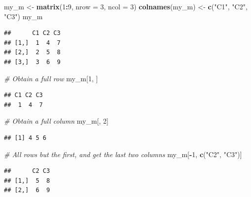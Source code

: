 \documentclass[
]{book}
\newenvironment{Shaded}{\begin{snugshade}}{\end{snugshade}}
\newcommand{\CommentTok}[1]{\textcolor[rgb]{0.56,0.35,0.01}{\textit{#1}}}
\newcommand{\DataTypeTok}[1]{\textcolor[rgb]{0.13,0.29,0.53}{#1}}
\newcommand{\DecValTok}[1]{\textcolor[rgb]{0.00,0.00,0.81}{#1}}
\newcommand{\KeywordTok}[1]{\textcolor[rgb]{0.13,0.29,0.53}{\textbf{#1}}}
\newcommand{\NormalTok}[1]{#1}
\newcommand{\OperatorTok}[1]{\textcolor[rgb]{0.81,0.36,0.00}{\textbf{#1}}}
\newcommand{\StringTok}[1]{\textcolor[rgb]{0.31,0.60,0.02}{#1}}
\begin{document}
\begin{Shaded}
\begin{Highlighting}[]
\NormalTok{my_m <-}\StringTok{ }\KeywordTok{matrix}\NormalTok{(}\DecValTok{1}\OperatorTok{:}\DecValTok{9}\NormalTok{, }\DataTypeTok{nrow =} \DecValTok{3}\NormalTok{, }\DataTypeTok{ncol =} \DecValTok{3}\NormalTok{)}
\KeywordTok{colnames}\NormalTok{(my_m) <-}\StringTok{ }\KeywordTok{c}\NormalTok{(}\StringTok{"C1"}\NormalTok{, }\StringTok{"C2"}\NormalTok{, }\StringTok{"C3"}\NormalTok{)}
\NormalTok{my_m}
\end{Highlighting}
\end{Shaded}

\begin{verbatim}
##      C1 C2 C3
## [1,]  1  4  7
## [2,]  2  5  8
## [3,]  3  6  9
\end{verbatim}

\begin{Shaded}
\begin{Highlighting}[]
\CommentTok{# Obtain a full row}
\NormalTok{my_m[}\DecValTok{1}\NormalTok{, ]}
\end{Highlighting}
\end{Shaded}

\begin{verbatim}
## C1 C2 C3 
##  1  4  7
\end{verbatim}

\begin{Shaded}
\begin{Highlighting}[]
\CommentTok{# Obtain a full column}
\NormalTok{my_m[, }\DecValTok{2}\NormalTok{]}
\end{Highlighting}
\end{Shaded}

\begin{verbatim}
## [1] 4 5 6
\end{verbatim}

\begin{Shaded}
\begin{Highlighting}[]
\CommentTok{# All rows but the first, and get the last two columns}
\NormalTok{my_m[}\OperatorTok{-}\DecValTok{1}\NormalTok{, }\KeywordTok{c}\NormalTok{(}\StringTok{"C2"}\NormalTok{, }\StringTok{"C3"}\NormalTok{)]}
\end{Highlighting}
\end{Shaded}

\begin{verbatim}
##      C2 C3
## [1,]  5  8
## [2,]  6  9
\end{verbatim}
\end{document}
